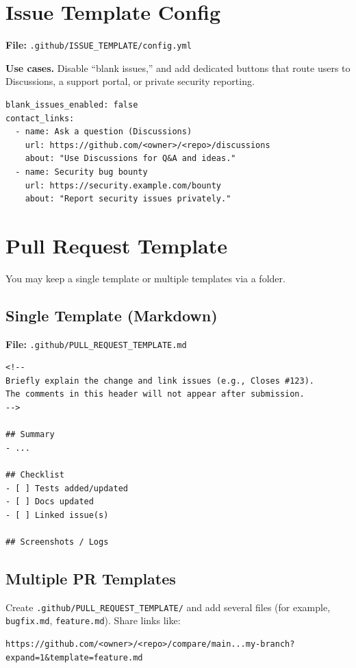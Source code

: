 \documentclass[11pt]{article}
\begin{document}
\section{Issue Template Config}
\noindent\textbf{File:} \texttt{.github/ISSUE\_TEMPLATE/config.yml}
\begin{tcolorbox}
\textbf{Use cases.} Disable ``blank issues,'' and add dedicated buttons that route users to Discussions,
a support portal, or private security reporting.
\end{tcolorbox}

\begin{verbatim}
blank_issues_enabled: false
contact_links:
  - name: Ask a question (Discussions)
    url: https://github.com/<owner>/<repo>/discussions
    about: "Use Discussions for Q&A and ideas."
  - name: Security bug bounty
    url: https://security.example.com/bounty
    about: "Report security issues privately."
\end{verbatim}
\clearpage

\section{Pull Request Template}
You may keep a single template or multiple templates via a folder.

\subsection{Single Template (Markdown)}
\noindent\textbf{File:} \texttt{.github/PULL\_REQUEST\_TEMPLATE.md}
\begin{verbatim}
<!--
Briefly explain the change and link issues (e.g., Closes #123).
The comments in this header will not appear after submission.
-->

## Summary
- ...

## Checklist
- [ ] Tests added/updated
- [ ] Docs updated
- [ ] Linked issue(s)

## Screenshots / Logs
\end{verbatim}

\subsection{Multiple PR Templates}
Create \texttt{.github/PULL\_REQUEST\_TEMPLATE/} and add several files (for example,
\texttt{bugfix.md}, \texttt{feature.md}). Share links like:
\begin{verbatim}
https://github.com/<owner>/<repo>/compare/main...my-branch?expand=1&template=feature.md
\end{verbatim}
\clearpage
\end{document}
